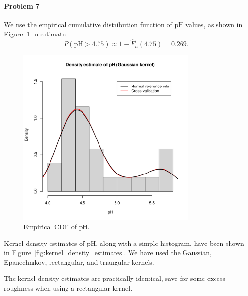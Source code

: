 \documentclass[10pt]{article}
\begin{document}
    \clearpage
    \paragraph{Problem 7} We use the empirical cumulative distribution
    function of pH values, as shown in Figure~\ref{fig:empirical_cdf} to estimate \[
        P(\text{pH} > 4.75) \approx 1 - \hat{F}_n(4.75) = 0.269.
    \]

    \begin{figure}[H]
         \centering
         \includegraphics[width=0.8\textwidth, page = 5]{acid-rain.pdf}
        \caption{Empirical CDF of pH.}
        \label{fig:empirical_cdf}
    \end{figure}


    Kernel density estimates of pH, along with a simple histogram, have been
    shown in Figure~\ref{fig:kernel_density_estimates}. We have used the
    Gaussian, Epanechnikov, rectangular, and triangular kernels.

    The kernel density estimates are practically identical, save for some
    excess roughness when using a rectangular kernel.
\end{document}
